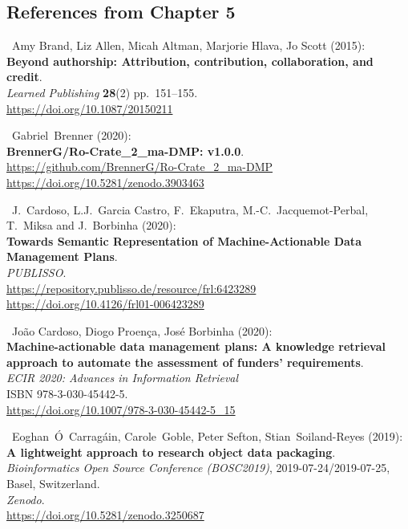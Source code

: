\begin{thebibliography}{9}



\section{References from Chapter 5}


~Amy Brand, Liz Allen, Micah Altman, Marjorie Hlava, Jo Scott
(2015):\\
\textbf{Beyond authorship: Attribution, contribution, collaboration, and
credit}.\\
\emph{Learned Publishing} \textbf{28}(2) pp.~151--155.\\
\url{https://doi.org/10.1087/20150211}

~Gabriel~Brenner (2020):\\
\textbf{BrennerG/Ro-Crate\_2\_ma-DMP: v1.0.0}.\\
\url{https://github.com/BrennerG/Ro-Crate_2_ma-DMP}~\\
\url{https://doi.org/10.5281/zenodo.3903463}

~J.~Cardoso, L.J.~Garcia Castro, F.~Ekaputra,
M.-C.~Jacquemot-Perbal, T.~Miksa and J.~Borbinha (2020):\\
\textbf{Towards Semantic Representation of Machine-Actionable Data
Management Plans}.\\
\emph{PUBLISSO}.\\
\url{https://repository.publisso.de/resource/frl:6423289}~\\
\url{https://doi.org/10.4126/frl01-006423289}

~João Cardoso, Diogo Proença, José Borbinha (2020):\\
\textbf{Machine-actionable data management plans: A knowledge retrieval
approach to automate the assessment of funders' requirements}.\\
\emph{ECIR 2020: Advances in Information Retrieval}\\
ISBN 978-3-030-45442-5.\\
\url{https://doi.org/10.1007/978-3-030-45442-5_15}

~Eoghan~Ó~Carragáin, Carole~Goble, Peter Sefton,
Stian~Soiland-Reyes (2019):\\
\textbf{A lightweight approach to research object data packaging}.\\
\emph{Bioinformatics Open Source Conference (BOSC2019)},
2019-07-24/2019-07-25, Basel, Switzerland.\\
\emph{Zenodo}.\\
\url{https://doi.org/10.5281/zenodo.3250687}


\end{thebibliography}

